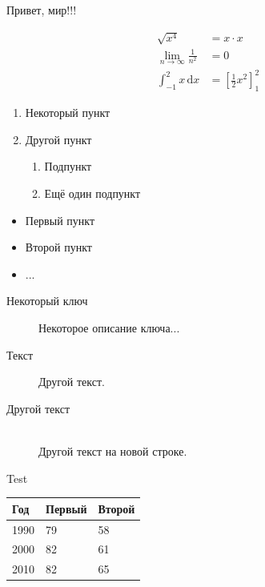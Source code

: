 \documentclass{article}
\begin{document}
Привет, мир!!!

\begin{align*}
\sqrt{x^4}&= x\cdot x\\
\lim_{n\to\infty}\frac 1{n^2}&= 0\\
\int_{-1}^2 x\, \mathrm{d}x &= \left[ \frac12 x^2 \right]_1^2
\end{align*}

\begin{enumerate}
\item Некоторый пункт
\item Другой пункт
  \begin{enumerate}
  \item Подпункт
  \item Ещё один подпункт
  \end{enumerate}
\end{enumerate}

\begin{itemize}
\item Первый пункт
\item Второй пункт
\item ...
\end{itemize}

\begin{description}
\item[Некоторый ключ] Некоторое описание ключа...
\item[Текст] Другой текст.
\item[Другой текст] \hfill\\Другой текст на новой строке.
\end{description}

Test

\begin{tabular}{|l|l|l|}
    \hline
    \textbf{Год} & \textbf{Первый} & \textbf{Второй} \\
    \hline
    1990 & 79 & 58 \\
    2000 & 82 & 61 \\
    2010 & 82 & 65 \\
    \hline
\end{tabular}
\end{document}

